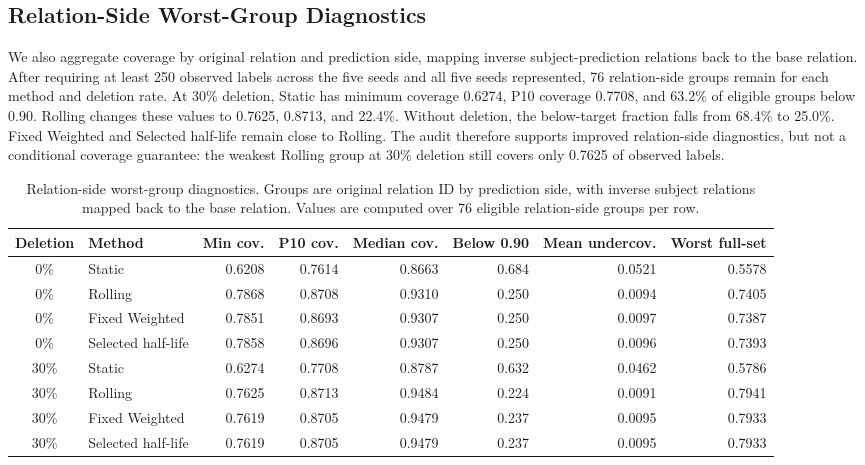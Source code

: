 \documentclass[information,article,submit,oneauthor,pdftex]{Definitions/mdpi}
\begin{document}
\subsection{Relation-Side Worst-Group Diagnostics}

We also aggregate coverage by original relation and prediction side, mapping
inverse subject-prediction relations back to the base relation. After requiring
at least 250 observed labels across the five seeds and all five seeds
represented, 76 relation-side groups remain for each method and deletion rate.
At 30\% deletion, Static has minimum coverage 0.6274, P10 coverage 0.7708, and
63.2\% of eligible groups below 0.90. Rolling changes these values to 0.7625,
0.8713, and 22.4\%. Without deletion, the below-target fraction falls from
68.4\% to 25.0\%. Fixed Weighted and Selected half-life remain close to Rolling. The audit
therefore supports improved relation-side diagnostics, but not a conditional
coverage guarantee: the weakest Rolling group at 30\% deletion still covers
only 0.7625 of observed labels.

\begin{table}[t]
\centering
\caption{Relation-side worst-group diagnostics. Groups are original relation
ID by prediction side, with inverse subject relations mapped back to the base
relation. Values are computed over 76 eligible relation-side groups per row.}
\label{tab:relation-worst}
\footnotesize
\setlength{\tabcolsep}{4pt}
\begin{tabular}{clrrrrrr}
\toprule
Deletion & Method & Min cov. & P10 cov. & Median cov. & Below 0.90 & Mean undercov. & Worst full-set\\
\midrule
0\% & Static & 0.6208 & 0.7614 & 0.8663 & 0.684 & 0.0521 & 0.5578\\
0\% & Rolling & 0.7868 & 0.8708 & 0.9310 & 0.250 & 0.0094 & 0.7405\\
0\% & Fixed Weighted & 0.7851 & 0.8693 & 0.9307 & 0.250 & 0.0097 & 0.7387\\
0\% & Selected half-life & 0.7858 & 0.8696 & 0.9307 & 0.250 & 0.0096 & 0.7393\\
\midrule
30\% & Static & 0.6274 & 0.7708 & 0.8787 & 0.632 & 0.0462 & 0.5786\\
30\% & Rolling & 0.7625 & 0.8713 & 0.9484 & 0.224 & 0.0091 & 0.7941\\
30\% & Fixed Weighted & 0.7619 & 0.8705 & 0.9479 & 0.237 & 0.0095 & 0.7933\\
30\% & Selected half-life & 0.7619 & 0.8705 & 0.9479 & 0.237 & 0.0095 & 0.7933\\
\bottomrule
\end{tabular}
\end{table}
\end{document}

